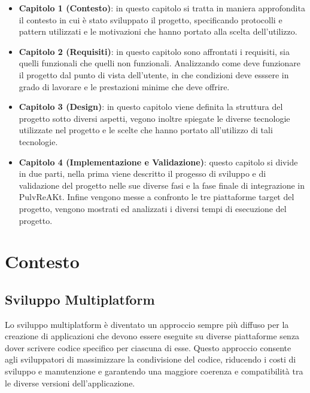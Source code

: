 \documentclass[12pt,a4paper,openright,twoside]{book}
\begin{document}
\begin{itemize}
    \item \textbf{Capitolo 1 (Contesto)}: in questo capitolo si tratta in maniera approfondita il contesto in cui è stato sviluppato il progetto, 
    specificando protocolli e pattern utilizzati e le motivazioni che hanno portato alla scelta dell'utilizzo.
    
    \item \textbf{Capitolo 2 (Requisiti)}: in questo capitolo sono affrontati i requisiti, sia quelli funzionali che quelli non funzionali. 
    Analizzando come deve funzionare il progetto dal punto di vista dell'utente, in che condizioni deve esssere in grado di lavorare 
    e le prestazioni minime che deve offrire. 
    
    \item \textbf{Capitolo 3 (Design)}: in questo capitolo viene definita la struttura del progetto sotto diversi aspetti, 
    vegono inoltre spiegate le diverse tecnologie utilizzate nel progetto e le scelte che hanno portato all'utilizzo di tali tecnologie.
    
    \item \textbf{Capitolo 4 (Implementazione e Validazione)}: questo capitolo si divide in due parti, nella prima viene descritto il progesso di sviluppo e di validazione
    del progetto nelle sue diverse fasi e la fase finale di integrazione in PulvReAKt. Infine vengono messe a confronto le tre piattaforme target del progetto, 
    vengono mostrati ed analizzati i diversi tempi di esecuzione del progetto. 
    
\end{itemize}

\chapter{Contesto}\label{chap:Contesto}

\section{Sviluppo Multiplatform}

Lo sviluppo multiplatform è diventato un approccio sempre più diffuso per la creazione di applicazioni che devono essere eseguite
su diverse piattaforme senza dover scrivere codice specifico per ciascuna di esse. Questo approccio consente agli sviluppatori di massimizzare
la condivisione del codice, riducendo i costi di sviluppo e manutenzione e garantendo una maggiore coerenza e compatibilità tra 
le diverse versioni dell'applicazione.
\end{document}
